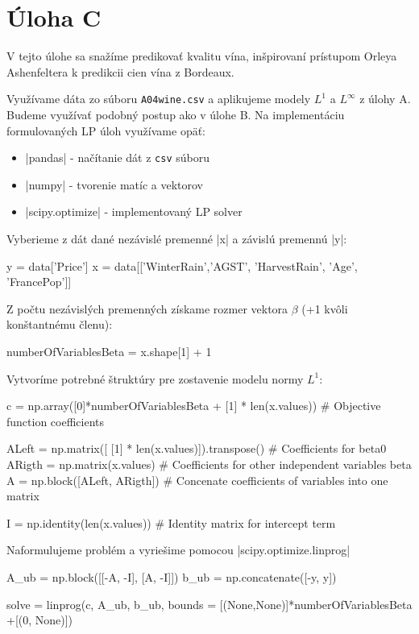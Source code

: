 \documentclass[report.tex]{subfiles}
\begin{document}
   

\section{Úloha C}\label{sec:C}
V tejto úlohe sa snažíme predikovať kvalitu vína, inšpirovaní prístupom Orleya Ashenfeltera k predikcii cien vína z Bordeaux.

Využívame dáta zo súboru \verb|A04wine.csv| a aplikujeme modely $L^1$ a $L^{\infty}$ z úlohy A. Budeme využívať podobný postup ako v úlohe B. Na implementáciu formulovaných LP úloh využívame opäť:
\begin{itemize}
	\item \pyth|pandas| - načítanie dát z \verb|csv| súboru
	\item \pyth|numpy| - tvorenie matíc a vektorov
	\item \pyth|scipy.optimize| - implementovaný LP solver
\end{itemize}

Vyberieme z dát dané nezávislé premenné \pyth|x| a závislú premennú \pyth|y|:

\begin{python}
y = data['Price']
x = data[['WinterRain','AGST', 'HarvestRain', 'Age', 'FrancePop']]
\end{python}

Z počtu nezávislých premenných získame rozmer vektora $\beta$ (+1 kvôli konštantnému členu):

\begin{python}
numberOfVariablesBeta = x.shape[1] + 1
\end{python}

Vytvoríme potrebné štruktúry pre zostavenie modelu normy $L^1$:

\begin{python}
c = np.array([0]*numberOfVariablesBeta + [1] * len(x.values)) # Objective function coefficients

ALeft = np.matrix([ [1] * len(x.values)]).transpose() # Coefficients for beta0
ARigth = np.matrix(x.values) # Coefficients for other independent variables beta
A = np.block([ALeft, ARigth]) # Concenate coefficients of variables into one matrix

I = np.identity(len(x.values)) # Identity matrix for intercept term
\end{python}

Naformulujeme problém a vyriešime pomocou \pyth|scipy.optimize.linprog|

\begin{python}
A_ub = np.block([[-A, -I], [A, -I]])
b_ub = np.concatenate([-y, y])

solve = linprog(c, A_ub, b_ub, bounds = [(None,None)]*numberOfVariablesBeta +[(0, None)])
\end{python}
\end{document}
